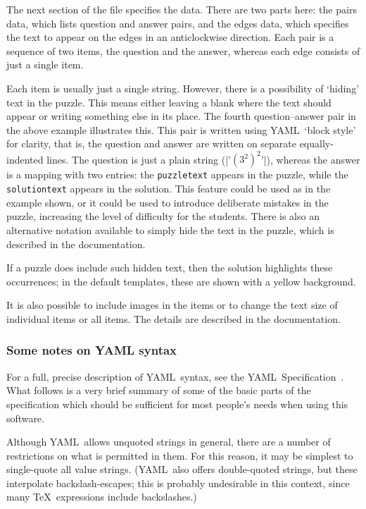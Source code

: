 \documentclass{article}
\def\YAML{{\small YAML}}
\begin{document}
The next section of the file specifies the data.  There are two parts
here: the pairs data, which lists question and answer pairs, and the
edges data, which specifies the text to appear on the edges in an
anticlockwise direction.  Each pair is a sequence of two items, the
question and the answer, whereas each edge consists of just a single
item.

Each item is usually just a single string.  However, there is a
possibility of `hiding' text in the puzzle.  This means either leaving
a blank where the text should appear or writing something else in its
place.  The fourth question--answer pair in the above example
illustrates this.  This pair is written using \YAML\ `block style' for
clarity, that is, the question and answer are written on separate
equally-indented lines.  The question is just a plain string
(|'$(3^2)^2$'|), whereas the answer is a mapping with two
entries: the \texttt{puzzletext} appears in the puzzle, while the
\texttt{solutiontext} appears in the solution.  This feature could be
used as in the example shown, or it could be used to introduce
deliberate mistakes in the puzzle, increasing the level of difficulty
for the students.  There is also an alternative notation available to
simply hide the text in the puzzle, which is described in the
documentation.

If a puzzle does include such hidden text, then the solution
highlights these occurrences; in the default templates, these are
shown with a yellow background.

It is also possible to include images in the items or to change the
text size of individual items or all items.  The details are described
in the documentation.

\subsubsection{Some notes on \texorpdfstring{\YAML}{YAML} syntax}

For a full, precise description of \YAML\ syntax, see the \YAML\
Specification~\cite{YAML}.  What follows is a very brief summary of
some of the basic parts of the specification which should be
sufficient for most people's needs when using this software.

Although \YAML\ allows unquoted strings in general, there are a number
of restrictions on what is permitted in them.  For this reason, it may
be simplest to single-quote all value strings.  (\YAML\ also offers
double-quoted strings, but these interpolate backslash-escapes; this
is probably undesirable in this context, since many \TeX\ expressions
include backslashes.)
\end{document}
